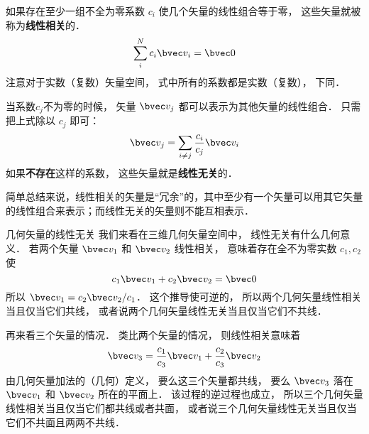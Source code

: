 

如果存在至少一组不全为零系数 $c_i$ 使几个矢量的线性组合等于零， 这些矢量就被称为\textbf{线性相关}的．
\begin{equation}
\sum_i^N c_i \bvec v_i = \bvec 0
\end{equation}
注意对于实数（复数）矢量空间， 式中所有的系数都是实数（复数）， 下同．

当系数$c_j$不为零的时候， 矢量 $\bvec v_j$ 都可以表示为其他矢量的线性组合． 只需把上式除以 $c_j$ 即可：
\begin{equation}
\bvec v_j = \sum_{i \ne j}\frac{c_i}{c_j} \bvec v_i
\end{equation}
如果\textbf{不存在}这样的系数， 这些矢量就是\textbf{线性无关}的．

简单总结来说，线性相关的矢量是“冗余”的，其中至少有一个矢量可以用其它矢量的线性组合来表示；而线性无关的矢量则不能互相表示．

\begin{example}{几何矢量的线性无关}\label{LinInd_ex2}
我们来看在三维几何矢量空间中， 线性无关有什么几何意义． 若两个矢量 $\bvec v_1$ 和 $\bvec v_2$ 线性相关， 意味着存在全不为零实数 $c_1, c_2$ 使
\begin{equation}
c_1 \bvec v_1 + c_2 \bvec v_2 = \bvec 0
\end{equation}
所以 $\bvec v_1 = c_2 \bvec v_2 / c_1$． 这个推导使可逆的， 所以两个几何矢量线性相关当且仅当它们共线， 或者说两个几何矢量线性无关当且仅当它们不共线．

再来看三个矢量的情况． 类比两个矢量的情况， 则线性相关意味着
\begin{equation}
\bvec v_3 = \frac{c_1}{c_3} \bvec v_1 +  \frac{c_2}{c_3} \bvec v_2
\end{equation}
由几何矢量加法的（几何）定义， 要么这三个矢量都共线， 要么 $\bvec v_3$ 落在 $\bvec v_1$ 和 $\bvec v_2$ 所在的平面上． 该过程的逆过程也成立， 所以三个几何矢量线性相关当且仅当它们都共线或者共面， 或者说三个几何矢量线性无关当且仅当它们不共面且两两不共线．
\end{example}
